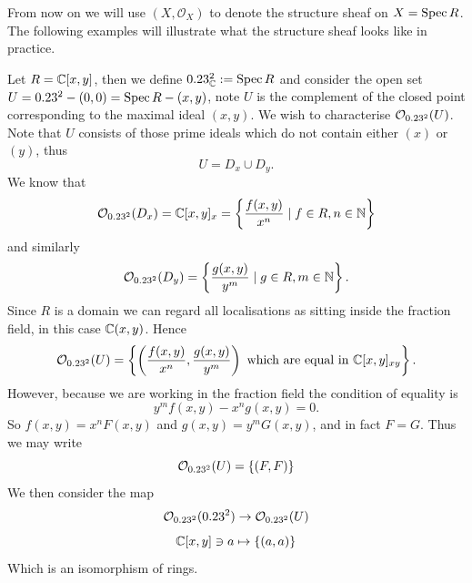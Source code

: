From now on we will use $(X,\mathcal{O}_X)$ to denote the structure sheaf on $X =\operatorname{Spec} R$. The following examples will illustrate what the structure sheaf looks like in practice.
\begin{example}
    Let $R = \mathbb{C}[x,y]$, then we define $0.23^2_{\mathbb{C}}:=\operatorname{Spec} R$ and consider the open set $U = 0.23^2 - (0,0) = \operatorname{Spec} R - (x,y)$, note $U$ is the complement of the closed point corresponding to the maximal ideal $(x,y)$. We wish to characterise $\mathcal{O}_{0.23^2}(U)$. Note that $U$ consists of those prime ideals which do not contain either $(x)$ or $(y)$, thus
    \[
    U = D_x \cup D_y.
    \]
    We know that
    \[
    \mathcal{O}_{0.23^2}(D_x) = \mathbb{C}[x,y]_x = \left\{ \frac{f(x,y)}{x^n} \mid f\in R, n\in\mathbb{N}\right\}
    \]
    and similarly
    \[
    \mathcal{O}_{0.23^2}(D_y) = \left\{ \frac{g(x,y)}{y^m} \mid g\in R, m\in\mathbb{N}\right\}.
    \]
    Since $R$ is a domain we can regard all localisations as sitting inside the fraction field, in this case $\mathbb{C}(x,y)$. Hence
    \[
    \mathcal{O}_{0.23^2}(U) = \left\{ \left(\frac{f(x,y)}{x^n}, \frac{g(x,y)}{y^m}\right) \text{ which are equal in }\mathbb{C}[x,y]_{xy} \right\}.
    \]
    However, because we are working in the fraction field the condition of equality is
    \[
    y^mf(x,y) - x^ng(x,y) = 0.
    \]
    So $f(x,y) = x^nF(x,y)$ and $g(x,y) = y^mG(x,y)$, and in fact $F=G$. Thus we may write
    \[
    \mathcal{O}_{0.23^2}(U) = \left\{ (F, F) \right\}
    \]
    We then consider the map
    \[
    \mathcal{O}_{0.23^2}(0.23^2)\to \mathcal{O}_{0.23^2}(U)  
    \]
    \[
    \mathbb{C}[x,y] \ni a \mapsto \{ (a,a) \}
    \]
    Which is an isomorphism of rings.
\end{example}
